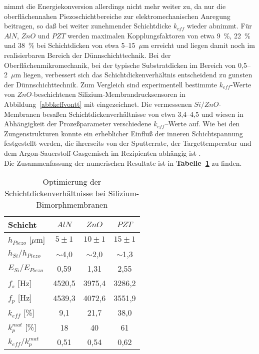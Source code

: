 nimmt die Energiekonversion allerdings nicht mehr weiter zu, da nur die
oberflächennahen Piezoschichtbereiche zur elektromechanischen Anregung
beitragen, so daß bei weiter zunehmender Schichtdicke $k_{eff}$ wieder
abnimmt. Für $AlN$, $ZnO$ und $PZT$ werden maximalen Kopplungsfaktoren
von etwa
9~\%, 22~\% und 38~\% bei Schichtdicken von etwa 5--15~$\mu$m erreicht und
liegen damit noch im realisierbaren Bereich der Dünnschichttechnik.
Bei der Oberflächenmikromechanik, bei der typische Substratdicken im
Bereich von 0,5--2~$\mu$m liegen, verbessert sich das
Schichtdickenverhältnis entscheidend zu gunsten der Dünnschichttechnik.
Zum Vergleich sind experimentell bestimmte $k_{eff}$-Werte
von $ZnO$-beschichtenen Silizium-Membrandrucksensoren in
Abbildung~\ref{abbkeffvontt} mit eingezeichnet.
Die vermessenen $Si/ZnO$-Membranen besaßen Schichtdickenverhältnisse
von etwa 3,4--4,5 und wiesen in Abhängigkeit der Prozeßparameter
verschiedene $k_{eff}$--Werte auf. Wie bei den Zungenstrukturen konnte
ein erheblicher Einfluß der inneren Schichtspannung festgestellt werden,
die ihrerseits von der Sputterrate, der Targettemperatur und
dem Argon-Sauerstoff-Gasgemisch im Rezipienten abhängig ist
\cite{ABV93}.\\
Die Zusammenfassung der numerischen Resultate ist in
{\bf Tabelle~\ref{taboptdicke}} zu finden.
\begin{table}[htb]
\caption{\label{taboptdicke}
 Optimierung der Schichtdickenverhältnisse bei Silizium-Bimorphmembranen}
\begin{center}
\begin{tabular} {|l||c|c|c|}
\hline
 Schicht & $AlN$ & $ZnO$ & $PZT$ \\
\hline \hline
 $h_{Piezo}$ [$\mu$m]   &  $5\pm1$   &  $10\pm1$   &  $15\pm1$   \\
 $h_{Si}/h_{Piezo}$     &  $\sim$4,0 &  $\sim$2,0  &  $\sim$1,3  \\
\hline
 $E_{Si}/E_{Piezo}$     &  0,59    &  1,31     &  2,55  \\
\hline
 $f_{s}$ [Hz]           & 4520,5    &  3975,4    &  3286,2     \\
 $f_{p}$ [Hz]           & 4539,3    &  4072,6    &  3551,9     \\
\hline \hline
 $k_{eff}$ [\%]         &  9,1      &  21,7      &  38,0       \\
 $k^{mat}_{p}$ [\%]     &  18       &  40        &  61         \\
 $k_{eff}/k^{mat}_{p}$  &  0,51     &  0,54      &  0,62       \\
\hline
\end{tabular}\\
\end{center}
\end{table}
